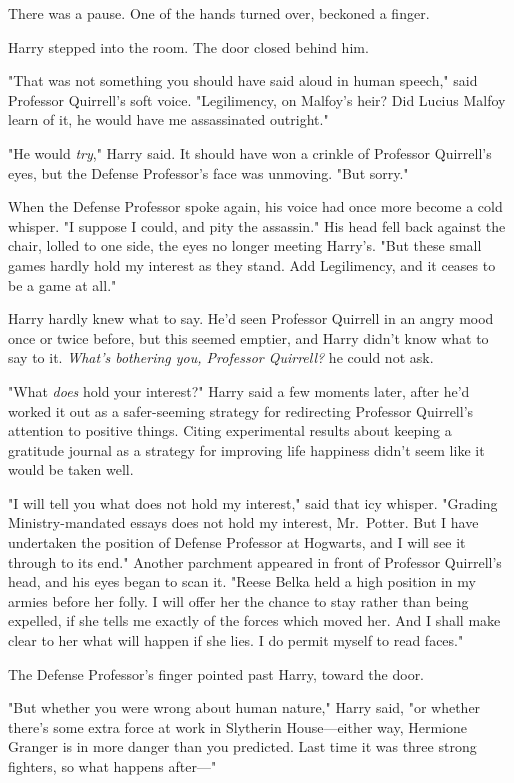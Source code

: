 There was a pause. One of the hands turned over, beckoned a finger.

Harry stepped into the room. The door closed behind him.

"That was not something you should have said aloud in human speech," said
Professor Quirrell's soft voice. "Legilimency, on Malfoy's heir? Did Lucius
Malfoy learn of it, he would have me assassinated outright."

"He would \emph{try}," Harry said. It should have won a crinkle of Professor
Quirrell's eyes, but the Defense Professor's face was unmoving. "But sorry."

When the Defense Professor spoke again, his voice had once more become a cold
whisper. "I suppose I could, and pity the assassin." His head fell back against
the chair, lolled to one side, the eyes no longer meeting Harry's. "But these
small games hardly hold my interest as they stand. Add Legilimency, and it
ceases to be a game at all."

Harry hardly knew what to say. He'd seen Professor Quirrell in an angry mood
once or twice before, but this seemed emptier, and Harry didn't know what to
say to it. \emph{What's bothering you, Professor Quirrell?} he could not
ask.

"What \emph{does} hold your interest?" Harry said a few moments later, after
he'd worked it out as a safer-seeming strategy for redirecting Professor
Quirrell's attention to positive things. Citing experimental results about
keeping a gratitude journal as a strategy for improving life happiness didn't
seem like it would be taken well.

"I will tell you what does not hold my interest," said that icy whisper.
"Grading Ministry-mandated essays does not hold my interest, Mr.~Potter. But I
have undertaken the position of Defense Professor at Hogwarts, and I will see
it through to its end." Another parchment appeared in front of Professor
Quirrell's head, and his eyes began to scan it. "Reese Belka held a high
position in my armies before her folly. I will offer her the chance to stay
rather than being expelled, if she tells me exactly of the forces which moved
her. And I shall make clear to her what will happen if she lies. I do permit
myself to read faces."

The Defense Professor's finger pointed past Harry, toward the door.

"But whether you were wrong about human nature," Harry said, "or whether
there's some extra force at work in Slytherin House---either way, Hermione
Granger is in more danger than you predicted. Last time it was three strong
fighters, so what happens after\mbox{---}"

